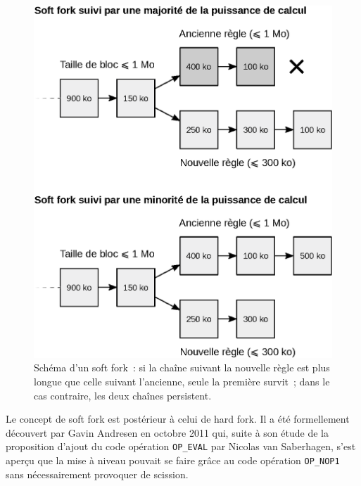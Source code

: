 \begin{figure}[h]
  \centering
  \includegraphics[scale=0.65]{img/soft-fork-induced-forks.eps}
  \caption{Schéma d'un soft fork~: si la chaîne suivant la nouvelle règle est plus longue que celle suivant l'ancienne, seule la première survit~; dans le cas contraire, les deux chaînes persistent.}
  \label{fig:soft-fork}
\end{figure}

Le concept de soft fork est postérieur à celui de hard fork. Il a été formellement découvert par Gavin Andresen en octobre 2011 qui, suite à son étude de la proposition d'ajout du code opération \texttt{OP\_EVAL} par Nicolas van Saberhagen, s'est aperçu que la mise à niveau pouvait se faire grâce au code opération \texttt{OP\_NOP1} sans nécessairement provoquer de scission.

